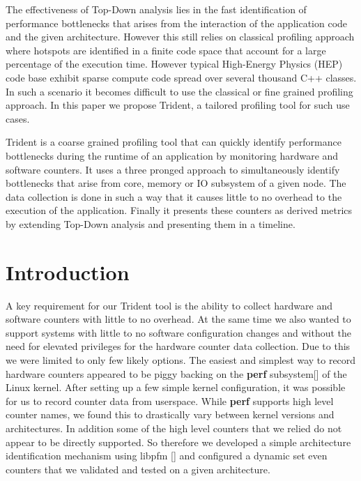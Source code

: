 \documentclass{webofc}
\begin{document}
The effectiveness of Top-Down analysis lies in the fast identification of performance bottlenecks that arises from the interaction of the application code and the given architecture. However this still relies on classical profiling approach where hotspots are identified in a finite code space that account for a large percentage of the execution time. However typical High-Energy Physics (HEP) code base exhibit sparse compute code spread over several thousand C++ classes. In such a scenario it becomes difficult to use the classical or fine grained profiling approach. In this paper we propose Trident, a tailored profiling tool for such use cases. 

Trident is a coarse grained profiling tool that can quickly identify performance bottlenecks during the runtime of an application by monitoring hardware and software counters. It uses a three pronged approach to simultaneously identify bottlenecks that arise from core, memory or IO subsystem of a given node. The data collection is done in such a way that it causes little to no overhead to the execution of the application. Finally it presents these counters as derived metrics by extending Top-Down analysis and presenting them in a timeline.


\section{Introduction}
\label{sec:intro}

A key requirement for our Trident tool is the ability to collect hardware and software counters with little to no overhead. At the same time we also wanted to support systems with little to no software configuration changes and without the need for elevated privileges for the hardware counter data collection. Due to this we were limited to only few likely options. The easiest and simplest way to record hardware counters appeared to be piggy backing on the \textbf{perf} subsystem[] of the Linux kernel. After setting up a few simple kernel configuration, it was possible for us to record counter data from userspace. While \textbf{perf} supports high level counter names, we found this to drastically vary between kernel versions and architectures. In addition some of the high level counters that we relied do not appear to be directly supported. So therefore we developed a simple architecture identification mechanism using libpfm [] and configured a dynamic set even counters that we validated and tested on a given architecture.
\end{document}
